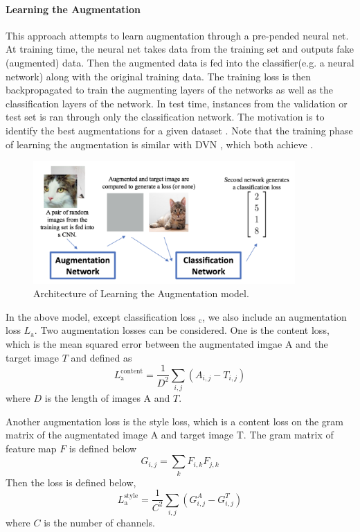 \documentclass{article}
\begin{document}
\paragraph{Learning the Augmentation} This approach attempts to learn augmentation through a pre-pended neural net. At training time, the neural net takes data from the training set and outputs fake (augmented) data. Then the augmented data is fed into the classifier(e.g. a neural network) along with the original training data. The training loss is then backpropagated to train the augmenting layers of the networks as well as the classification layers of the network. In test time, instances from the validation or test set is ran through only the classification network. The motivation is to identify the best augmentations for a given dataset \cite{perez2017effectiveness}. Note that the training phase of learning the augmentation is similar with DVN \cite{gygli2017deep}, which both achieve {\color{red}{training and data augmentation simultaneously}}.
\begin{figure}[h]
\label{fig:cmb}
\centering
\includegraphics[width=10cm]{figures/learningaug}
\caption{Architecture of Learning the Augmentation model.}
\end{figure}

In the above model, except classification loss $_{\text{c}}$, we also include an augmentation loss $L_{\text{a}}$. Two augmentation losses can be considered. One is the content loss, which is the mean squared error between the augmentated imgae A and the target image $T$ and defined as
\[
L_{\text{a}}^{\text{content}}=\frac{1}{D^2}\sum_{i,j}(A_{i,j}-T_{i,j})
\]
where $D$ is the length of images A and $T$.

Another augmentation loss is the style loss, which is a content loss on the gram matrix of the augmentated image A and target image T. The gram matrix of feature map $F$ is defined below
\[
G_{i,j}=\sum_k F_{i,k}F_{j,k}
\]
Then the loss is defined below,
\[
L_{\text{a}}^{\text{style}}=\frac{1}{C^2}\sum_{i,j}(G_{i,j}^A-G_{i,j}^T)
\]
where $C$ is the number of channels.
\end{document}
